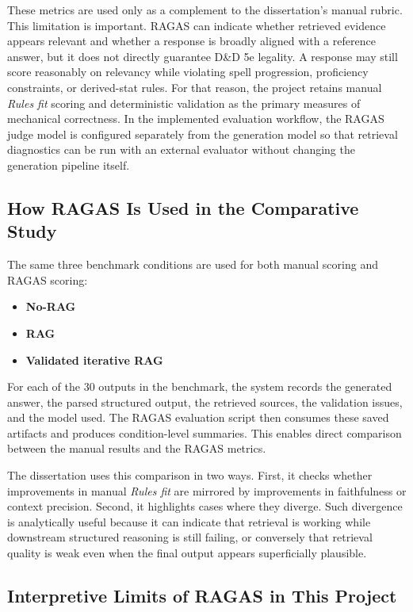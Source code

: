 These metrics are used only as a complement to the dissertation's manual rubric. This limitation is important. RAGAS can indicate whether retrieved evidence appears relevant and whether a response is broadly aligned with a reference answer, but it does not directly guarantee D\&D 5e legality. A response may still score reasonably on relevancy while violating spell progression, proficiency constraints, or derived-stat rules. For that reason, the project retains manual \textit{Rules fit} scoring and deterministic validation as the primary measures of mechanical correctness. In the implemented evaluation workflow, the RAGAS judge model is configured separately from the generation model so that retrieval diagnostics can be run with an external evaluator without changing the generation pipeline itself.

\subsection{How RAGAS Is Used in the Comparative Study}

The same three benchmark conditions are used for both manual scoring and RAGAS scoring:
\begin{itemize}
    \item \textbf{No-RAG}
    \item \textbf{RAG}
    \item \textbf{Validated iterative RAG}
\end{itemize}

For each of the 30 outputs in the benchmark, the system records the generated answer, the parsed structured output, the retrieved sources, the validation issues, and the model used. The RAGAS evaluation script then consumes these saved artifacts and produces condition-level summaries. This enables direct comparison between the manual results and the RAGAS metrics.

The dissertation uses this comparison in two ways. First, it checks whether improvements in manual \textit{Rules fit} are mirrored by improvements in faithfulness or context precision. Second, it highlights cases where they diverge. Such divergence is analytically useful because it can indicate that retrieval is working while downstream structured reasoning is still failing, or conversely that retrieval quality is weak even when the final output appears superficially plausible.

\subsection{Interpretive Limits of RAGAS in This Project}

